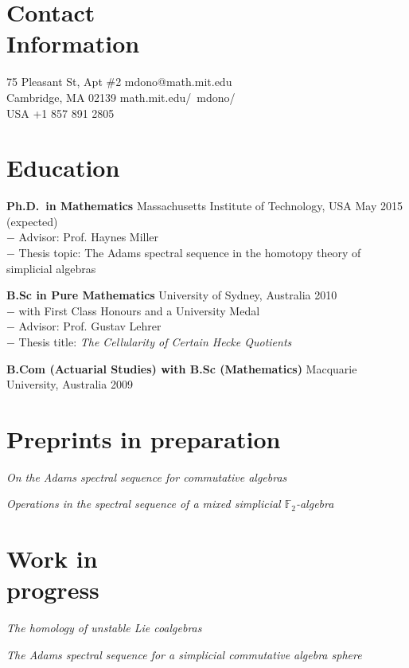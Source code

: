 \documentclass[margin,line]{resume}
\newcommand{\CVsection}[1]{\section{\mysidestyle #1}}
\newcommand{\entry}[3]{\textbf{#1} #2 \hfill {#3}
           
\vspace{-2.7mm}}
\newcommand{\twolineentry}[4]{\textbf{#1} #2 \hfill {#4}\\%
#3
           
\vspace{-2.7mm}}
\newcommand{\FINALentry}[3]{\textbf{#1} #2 \hfill {#3}}
\begin{document}
\begin{resume}

\CVsection{Contact\\Information}

75 Pleasant St, Apt \#2 \hfill {mdono@math.mit.edu}\\
Cambridge, MA  02139 \hfill {math.mit.edu/~mdono/}\\
USA \hfill +1 857 891 2805





\CVsection{Education}

\twolineentry{Ph.D.\ in Mathematics}{Massachusetts Institute of Technology, USA}{%
\phantom{space}$-$ Advisor: Prof. Haynes Miller\\
\phantom{space}$-$ Thesis topic: The Adams spectral sequence in the homotopy theory of simplicial algebras%
}{May 2015 (expected)}
\twolineentry{B.Sc in Pure Mathematics}{University of Sydney, Australia}{%
\phantom{space}$-$ with First Class Honours and a University Medal\\
\phantom{space}$-$ Advisor: Prof. Gustav Lehrer\\
\phantom{space}$-$ Thesis title: \emph{The Cellularity of Certain Hecke Quotients}
}{2010}
\FINALentry{B.Com (Actuarial Studies) with B.Sc (Mathematics)}{Macquarie University, Australia}{2009}


\CVsection{Preprints in preparation}

\entry{\hspace{-.275em}}{\emph{On the Adams spectral sequence for commutative algebras}}{}
\entry{\hspace{-.275em}}{\emph{Operations in the spectral sequence of a mixed simplicial $\mathbb{F}_2$-algebra}}{}


\CVsection{Work in \\progress}

\entry{\hspace{-.275em}}{\emph{The homology of unstable Lie coalgebras}}{}
\FINALentry{\hspace{-.275em}}{\emph{The Adams spectral sequence for a simplicial commutative algebra
sphere}}{}



\end{resume}
\end{document}
